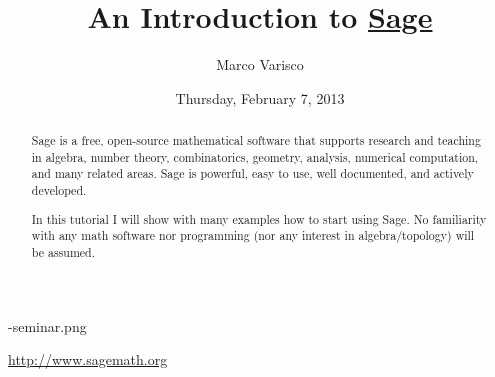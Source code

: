 \documentclass{UAmathtalk}
\author{Marco Varisco}
\title{An Introduction to \href{http://www.sagemath.org}{Sage}}
\date{Thursday, February 7, 2013}
\begin{document}
\maketitle

\begin{abstract}
Sage is a free, open-source mathematical software that supports research and teaching in algebra, number theory, combinatorics, geometry, analysis, numerical computation, and many related areas.
Sage is powerful, easy to use, well documented, and actively developed.

In this tutorial I will show with many examples how to start using Sage.
No familiarity with any math software nor programming (nor any interest in algebra/topology) will be assumed.
\end{abstract}

\vfill\centerline{-seminar.png}\vfill

\centerline{\url{http://www.sagemath.org}}
\end{document}
